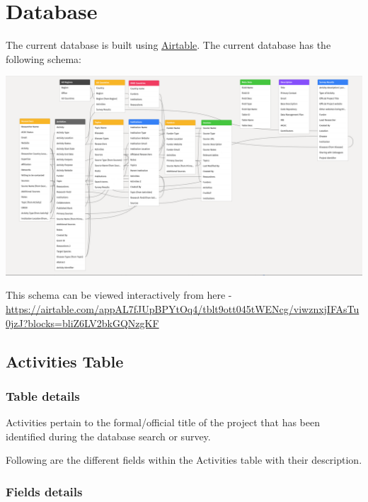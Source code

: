 \documentclass[
]{book}
\begin{document}
\hypertarget{database}{%
\chapter{Database}\label{database}}

The current database is built using \href{https://airtable.com}{Airtable}. The current database has the following schema:

\includegraphics{images/database_schema.png}

This schema can be viewed interactively from here - \url{https://airtable.com/appAL7fJUpBPYtOq4/tblt9ott045tWENcg/viwznxjIFAsTu0jzJ?blocks=bliZ6LV2bkGQNzgKF}

\hypertarget{activities-table}{%
\section{Activities Table}\label{activities-table}}

\hypertarget{table-details}{%
\subsection{Table details}\label{table-details}}

Activities pertain to the formal/official title of the project that has been identified during the database search or survey.

Following are the different fields within the Activities table with their description.

\hypertarget{fields-details}{%
\subsection{Fields details}\label{fields-details}}
\end{document}
